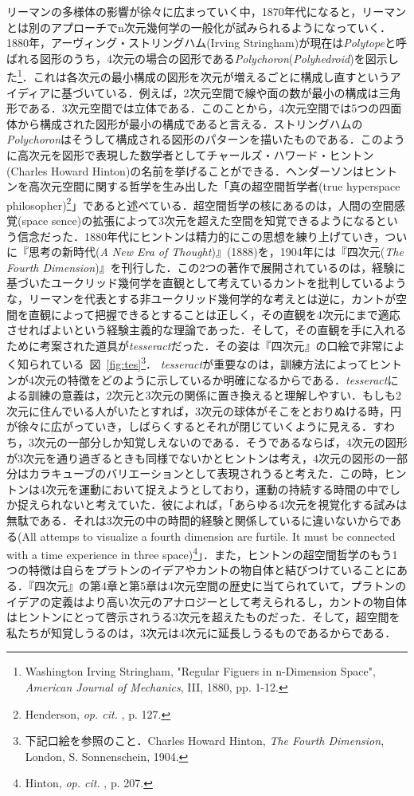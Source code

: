 リーマンの多様体の影響が徐々に広まっていく中，1870年代になると，リーマンとは別のアプローチでn次元幾何学の一般化が試みられるようになっていく．1880年，アーヴィング・ストリングハム(Irving Stringham)が現在は\emph{Polytope}と呼ばれる図形のうち，4次元の場合の図形である\emph{Polychoron}(\emph{Polyhedroid})を図示した\footnote{Washington Irving Stringham, "Regular Figuers in n-Dimension Space", \emph{American Journal of Mechanics}, III, 1880, pp. 1-12.}．これは各次元の最小構成の図形を次元が増えるごとに構成し直すというアイディアに基づいている．例えば，2次元空間で線や面の数が最小の構成は三角形である．3次元空間では立体である．このことから，4次元空間では5つの四面体から構成された図形が最小の構成であると言える．ストリングハムの\emph{Polychoron}はそうして構成される図形のパターンを描いたものである．このように高次元を図形で表現した数学者としてチャールズ・ハワード・ヒントン(Charles Howard Hinton)の名前を挙げることができる．ヘンダーソンはヒントンを高次元空間に関する哲学を生み出した「真の超空間哲学者(true hyperspace philosopher)\footnote{Henderson, \emph{op. cit.} , p. 127.}」であると述べている．超空間哲学の核にあるのは，人間の空間感覚(space sence)の拡張によって3次元を超えた空間を知覚できるようになるという信念だった．1880年代にヒントンは精力的にこの思想を練り上げていき，ついに『思考の新時代(\emph{A New Era of Thought})』(1888)を，1904年には『四次元(\emph{The Fourth Dimension})』を刊行した．この2つの著作で展開されているのは，経験に基づいたユークリッド幾何学を直観として考えているカントを批判しているような，リーマンを代表とする非ユークリッド幾何学的な考えとは逆に，カントが空間を直観によって把握できるとすることは正しく，その直観を4次元にまで適応させればよいという経験主義的な理論であった．そして，その直観を手に入れるために考案された道具が\emph{tesseract}だった．その姿は『四次元』の口絵で非常によく知られている~図~\ref{fig:tes}\footnote{下記口絵を参照のこと．Charles Howard Hinton, \emph{The Fourth Dimension}, London, S. Sonnenschein, 1904.}．
\emph{tesseract}が重要なのは，訓練方法によってヒントンが4次元の特徴をどのように示しているか明確になるからである．\emph{tesseract}による訓練の意義は，2次元と3次元の関係に置き換えると理解しやすい．もしも2次元に住んでいる人がいたとすれば，3次元の球体がそこをとおりぬける時，円が徐々に広がっていき，しばらくするとそれが閉じていくように見える．すわち，3次元の一部分しか知覚しえないのである．そうであるならば，4次元の図形が3次元を通り過ぎるときも同様でないかとヒントンは考え，4次元の図形の一部分はカラキューブのバリエーションとして表現されうると考えた．この時，ヒントンは4次元を運動において捉えようとしており，運動の持続する時間の中でしか捉えられないと考えていた．彼によれば，「あらゆる4次元を視覚化する試みは無駄である．それは3次元の中の時間的経験と関係しているに違いないからである(All attemps to visualize a fourth dimension are furtile. It must be connected with a time experience in three space)\footnote{Hinton, \emph{op. cit. }, p. 207.}」．また，ヒントンの超空間哲学のもう1つの特徴は自らをプラトンのイデアやカントの物自体と結びつけていることにある．『四次元』の第4章と第5章は4次元空間の歴史に当てられていて，プラトンのイデアの定義はより高い次元のアナロジーとして考えられるし，カントの物自体はヒントンにとって啓示されうる3次元を超えたものだった．そして，超空間を私たちが知覚しうるのは，3次元は4次元に延長しうるものであるからである．

